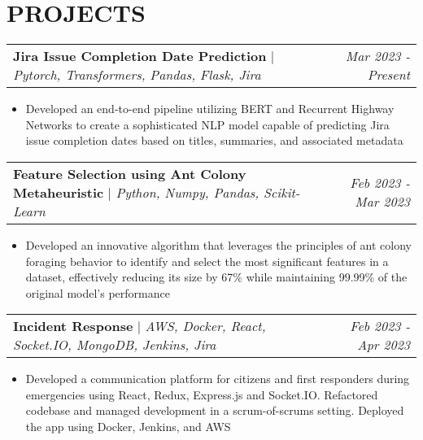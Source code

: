 \documentclass[letterpaper]{article}
\makeatletter
\newcommand{\resumeItemWithoutTitle}[1]{
  \item{
    {#1 \vspace{-4pt}}
  }
}
\newcommand{\shortSection}[1]{
    \vspace{-6pt}
    \section{#1}
}
\newcommand{\projectHeading}[4]{
  \begin{tabular*}{\textwidth}{l@{\extracolsep{\fill}}r}
        \textbf{#1} 
        \hspace{-2pt} $\vert$ \hspace{-2pt} {\textit{#2}} 
        \hspace{-2pt} $\vert$ \hspace{-2pt} \href{#3}{ \underline{Link}}
        &
        \textit{#4} \\
    \end{tabular*}\vspace{-2pt}
}
\newcommand{\projectHeadingWithoutLink}[3]{
  \begin{tabular*}{\textwidth}{l@{\extracolsep{\fill}}r}
        \textbf{#1} 
        \hspace{-2pt} $\vert$ \hspace{-2pt} {\textit{#2}}
        & 
        \textit{#3} \\
    \end{tabular*}\vspace{-2pt}
}
\newcommand{\resumeItemListStart}{\begin{itemize}}
\newcommand{\resumeItemListEnd}{\end{itemize}}
\makeatother
\begin{document}

\shortSection{PROJECTS}

\projectHeadingWithoutLink{Jira Issue Completion Date Prediction}{Pytorch, Transformers, Pandas, Flask, Jira}{Mar 2023 - Present}
\resumeItemListStart
\resumeItemWithoutTitle{Developed an end-to-end pipeline utilizing BERT and Recurrent Highway Networks to create a sophisticated NLP model capable of predicting Jira issue completion dates based on titles, summaries, and associated metadata}
\resumeItemListEnd


\vspace{3pt}
\projectHeadingWithoutLink{Feature Selection using Ant Colony Metaheuristic}{Python, Numpy, Pandas, Scikit-Learn}{Feb 2023 - Mar 2023}
\resumeItemListStart
\resumeItemWithoutTitle{Developed an innovative algorithm that leverages the principles of ant colony foraging behavior to identify and select the most significant features in a dataset, effectively reducing its size by 67\% while maintaining 99.99\% of the original model's performance}
\resumeItemListEnd


\vspace{3pt}
\projectHeadingWithoutLink{Incident Response}{AWS, Docker, React, Socket.IO, MongoDB, Jenkins, Jira}{Feb 2023 - Apr 2023}
\resumeItemListStart
\resumeItemWithoutTitle{Developed a communication platform for citizens and first responders during emergencies using React, Redux, Express.js and Socket.IO. Refactored codebase and managed development in a scrum-of-scrums setting. Deployed the app using Docker, Jenkins, and AWS}
\resumeItemListEnd



\end{document}
